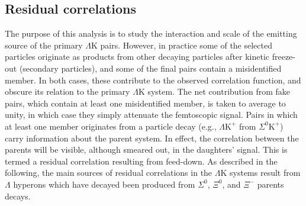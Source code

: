 \documentclass[ALICE,manyauthors]{cernphprep}
\newcommand{\Lam}{$\Lambda$\xspace}
\newcommand{\KchP}{$\mathrm{K^{+}}$\xspace}
\newcommand{\LamK}{$\Lambda$K\xspace}
\newcommand{\LamKchP}{$\Lambda\mathrm{K^{+}}$\xspace}
\begin{document}
\subsection{Residual correlations}
\label{ResidualCorrelations}

The purpose of this analysis is to study the interaction and scale of the emitting source of the primary \LamK pairs.
However, in practice some of the selected particles originate as products from other decaying particles after kinetic freeze-out (secondary particles), and some of the final pairs contain a misidentified member.
In both cases, these contribute to the observed correlation function, and obscure its relation to the primary \LamK system.
The net contribution from fake pairs, which contain at least one misidentified member, is taken to average to unity, in which case they simply attenuate the femtoscopic signal.
Pairs in which at least one member originates from a particle decay (e.g., \LamKchP from $\Sigma^{0}$\KchP) carry information about the parent system.
In effect, the correlation between the parents will be visible, although smeared out, in the daughters' signal.
This is termed a residual correlation resulting from feed-down.  
As described in the following, the main sources of residual correlations in the \LamK systems result from \Lam hyperons which have {\color{red}decayed} {\color{blue}been produced} from $\Sigma^{0}$, $\Xi^{0}$, and $\Xi^{-}$ {\color{red}parents} {\color{blue}decays}. 
\end{document}
